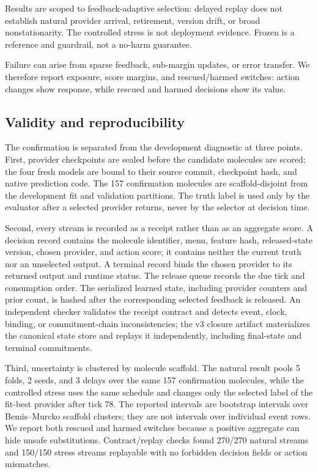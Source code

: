 \documentclass[sigconf,anonymous]{aamas}
\begin{document}
Results are scoped to feedback-adaptive selection: delayed replay does not establish natural provider arrival, retirement, version drift, or broad nonstationarity. The controlled stress is not deployment evidence. Frozen is a reference and guardrail, not a no-harm guarantee.

Failure can arise from sparse feedback, sub-margin updates, or error transfer. We therefore report exposure, score margins, and rescued/harmed switches: action changes show response, while rescued and harmed decisions show its value.

\subsection{Validity and reproducibility}
The confirmation is separated from the development diagnostic at three points. First, provider checkpoints are sealed before the candidate molecules are scored; the four fresh models are bound to their source commit, checkpoint hash, and native prediction code. The 157 confirmation molecules are scaffold-disjoint from the development fit and validation partitions. The truth label is used only by the evaluator after a selected provider returns, never by the selector at decision time.

Second, every stream is recorded as a receipt rather than as an aggregate score. A decision record contains the molecule identifier, menu, feature hash, released-state version, chosen provider, and action score; it contains neither the current truth nor an unselected output. A terminal record binds the chosen provider to its returned output and runtime status. The release queue records the due tick and consumption order. The serialized learned state, including provider counters and prior count, is hashed after the corresponding selected feedback is released. An independent checker validates the receipt contract and detects event, clock, binding, or commitment-chain inconsistencies; the v3 closure artifact materializes the canonical state store and replays it independently, including final-state and terminal commitments.

Third, uncertainty is clustered by molecule scaffold. The natural result pools 5 folds, 2 seeds, and 3 delays over the same 157 confirmation molecules, while the controlled stress uses the same schedule and changes only the selected label of the fit-best provider after tick 78. The reported intervals are bootstrap intervals over Bemis--Murcko scaffold clusters; they are not intervals over individual event rows. We report both rescued and harmed switches because a positive aggregate can hide unsafe substitutions. Contract/replay checks found 270/270 natural streams and 150/150 stress streams replayable with no forbidden decision fields or action mismatches.
\end{document}
